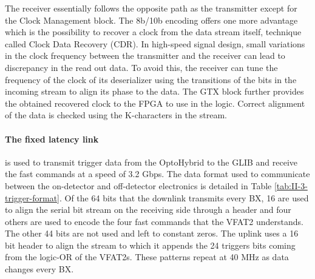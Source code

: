       The receiver essentially follows the opposite path as the transmitter except for the Clock Management block. The 8b/10b encoding offers one more advantage which is the possibility to recover a clock from the data stream itself, technique called Clock Data Recovery (CDR). In high-speed signal design, small variations in the clock frequency between the transmitter and the receiver can lead to discrepancy in the read out data. To avoid this, the receiver can tune the frequency of the clock of its deserializer using the transitions of the bits in the incoming stream to align its phase to the data. The GTX block further provides the obtained recovered clock to the FPGA to use in the logic. Correct alignment of the data is checked using the K-characters in the stream.

      \paragraph{The fixed latency link} is used to transmit trigger data from the OptoHybrid to the GLIB and receive the fast commands at a speed of 3.2 Gbps. The data format used to communicate between the on-detector and off-detector electronics is detailed in Table \ref{tab:II-3-trigger-format}. Of the 64 bits that the downlink transmits every BX, 16 are used to align the serial bit stream on the receiving side through a header and four others are used to encode the four fast commands that the VFAT2 understands. The other 44 bits are not used and left to constant zeros. The uplink uses a 16 bit header to align the stream to which it appends the 24 triggers bits coming from the logic-OR of the VFAT2s. These patterns repeat at 40 MHz as data changes every BX.

